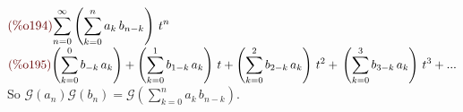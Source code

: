\begin{math}\displaystyle
\parbox{8ex}{\color{labelcolor}(\%o194) }
\sum_{n=0}^{\infty }\left( \sum_{k=0}^{n}{a}_{k}\,{b}_{n-k}\right) \,{t}^{n}
\end{math}\\
\begin{math}\displaystyle
\parbox{8ex}{\color{labelcolor}(\%o195) }
\left( \sum_{k=0}^{0}{b}_{-k}\,{a}_{k}\right) +\left(
  \sum_{k=0}^{1}{b}_{1-k}\,{a}_{k}\right) \,t+\left(
  \sum_{k=0}^{2}{b}_{2-k}\,{a}_{k}\right) \,{t}^{2}+\\
\left( \sum_{k=0}^{3}{b}_{3-k}\,{a}_{k}\right) \,{t}^{3}+...
\end{math}\\
So $\mathcal{G}(a_n)\mathcal{G}(b_n) =\mathcal{G}\left(
  \sum_{k=0}^{n}{a}_{k}\,{b}_{n-k}\right)$.






